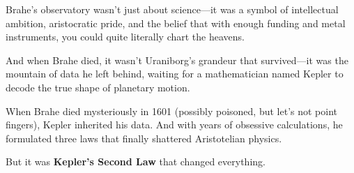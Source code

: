 \begin{tcolorbox}[colback=blue!5!white, colframe=blue!50!black, title={Historical Sidebar: Tycho Brahe’s Uraniborg — The Hubble of the Renaissance}, breakable]
  \medskip
  
  Brahe’s observatory wasn’t just about science—it was a symbol of intellectual ambition, aristocratic pride, and the belief that with enough funding and metal instruments, you could quite literally chart the heavens.

  \medskip
  
  And when Brahe died, it wasn’t Uraniborg’s grandeur that survived—it was the mountain of data he left behind, waiting for a mathematician named Kepler to decode the true shape of planetary motion.
  
\end{tcolorbox}

\medskip

When Brahe died mysteriously in 1601 (possibly poisoned, but let’s not point fingers), Kepler inherited his data. And with years of obsessive calculations, he formulated three laws that finally shattered Aristotelian physics.

But it was \textbf{Kepler’s Second Law} that changed everything.

